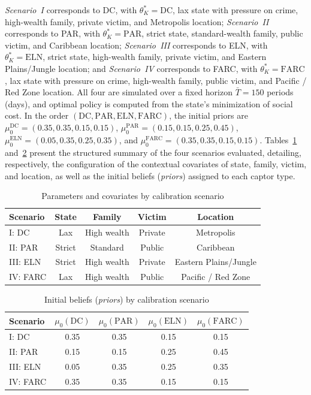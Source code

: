 \documentclass[pdflatex,sn-mathphys-ay]{sn-jnl}
\theoremstyle{plain}
\theoremstyle{definition}
\newcommand{\1}{\mathbf{1}}
\begin{document}
\emph{Scenario~I} corresponds to DC, with $\theta_K^\ast=\mathrm{DC}$, lax state with pressure on crime, high-wealth family, private victim, and Metropolis location; \emph{Scenario~II} corresponds to PAR, with $\theta_K^\ast=\mathrm{PAR}$, strict state, standard-wealth family, public victim, and Caribbean location; \emph{Scenario~III} corresponds to ELN, with $\theta_K^\ast=\mathrm{ELN}$, strict state, high-wealth family, private victim, and Eastern Plains/Jungle location; and \emph{Scenario~IV} corresponds to FARC, with $\theta_K^\ast=\mathrm{FARC}$, lax state with pressure on crime, high-wealth family, public victim, and Pacific / Red Zone location. All four are simulated over a fixed horizon $\bar{T}=150$ periods (days), and optimal policy is computed from the state's minimization of social cost. In the order $(\mathrm{DC},\mathrm{PAR},\mathrm{ELN},\mathrm{FARC})$, the initial priors are $\mu_0^{\mathrm{DC}}=(0.35,0.35,0.15,0.15)$, $\mu_0^{\mathrm{PAR}}=(0.15,0.15,0.25,0.45)$, $\mu_0^{\mathrm{ELN}}=(0.05,0.35,0.25,0.35)$, and $\mu_0^{\mathrm{FARC}}=(0.35,0.35,0.15,0.15)$. Tables~\ref{tab:covariables-escenarios} and~\ref{tab:priors-escenarios} present the structured summary of the four scenarios evaluated, detailing, respectively, the configuration of the contextual covariates of state, family, victim, and location, as well as the initial beliefs (\emph{priors}) assigned to each captor type.

\begin{table}[!ht]
\small
\caption{Parameters and covariates by calibration scenario}
\label{tab:covariables-escenarios}
\begin{tabular}{lcccc}
\toprule
Scenario & State & Family & Victim & Location \\ \midrule
I: DC & Lax & High wealth & Private & Metropolis \\
II: PAR & Strict & Standard & Public & Caribbean \\
III: ELN & Strict & High wealth & Private & Eastern Plains/Jungle \\
IV: FARC & Lax & High wealth & Public & Pacific / Red Zone \\ \bottomrule
\end{tabular}
\end{table}

\begin{table}[!ht]
\small
\caption{Initial beliefs (\emph{priors}) by calibration scenario}
\label{tab:priors-escenarios}
\begin{tabular}{lcccc}
\toprule
Scenario & $\mu_0(\mathrm{DC})$ & $\mu_0(\mathrm{PAR})$ & $\mu_0(\mathrm{ELN})$ & $\mu_0(\mathrm{FARC})$ \\ \midrule
I: DC & 0.35 & 0.35 & 0.15 & 0.15 \\
II: PAR & 0.15 & 0.15 & 0.25 & 0.45 \\
III: ELN & 0.05 & 0.35 & 0.25 & 0.35 \\
IV: FARC & 0.35 & 0.35 & 0.15 & 0.15 \\ \bottomrule
\end{tabular}
\end{table}
\end{document}
